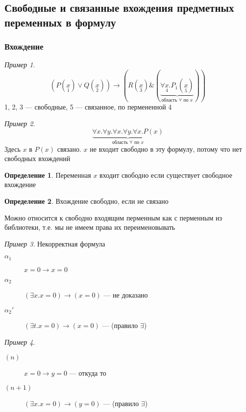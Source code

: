 \documentclass[english]{article}
\theoremstyle{plain}
\theoremstyle{remark}
\newtheorem*{examp}{Пример}
\theoremstyle{definition}
\newtheorem*{definition}{Определение}
\begin{document}
\subsection{Свободные и связанные вхождения предметных переменных в формулу}
\label{sec:orgbcbaf07}
\subsubsection{Вхождение}
\label{sec:org2ad6512}
\begin{examp}
\[ (P(\underset{1}{x}) \vee Q(\underset{2}{x})) \to (R(\underset{3}{x}) \& (\underbrace{\forall \underset{4}{x}. P_1(\underset{5}{x})}_{\text{область }\forall\text{ по }x})) \]
1, 2, 3 --- свободные, 5 --- связанное, по пермененной 4
\end{examp}
\begin{examp}
\[ \underbrace{\forall x. \forall y. \forall x. \forall y. \forall x. P(x)}_{\text{область }\forall\text{ по }x} \]
Здесь \(x\) в \(P(x)\) связано. \(x\) не входит свободно в эту формулу, потому что нет свободных вхождений
\end{examp}
\begin{definition}
Переменная \(x\) входит свободно если существует свободное вхождение
\end{definition}
\begin{definition}
Вхождение свободно, если не связано
\end{definition}
Можно относится к свободно входящим перменным как с перменным из библиотеки, т.е. мы не имеем права их переименовывать
\begin{examp}
Некорректная формула
\begin{description}
\item[{\(\alpha_1\)}] \(x = 0 \to x = 0\)
\item[{\(\alpha_2\)}] \color{red}\((\exists x. x = 0) \to (x = 0)\) --- не доказано\color{black}
\item[{\(\alpha_2'\)}] \((\exists t. x = 0) \to (x = 0)\) --- (правило \(\exists\))
\end{description}
\end{examp}
\begin{examp}
\-
\begin{description}
\item[{\((n)\)}] \(x = 0 \to y = 0\) --- откуда то
\item[{\((n + 1)\)}] \((\exists x. x = 0) \to (y = 0)\) --- (правило \(\exists\))
\end{description}
\end{examp}
\end{document}
